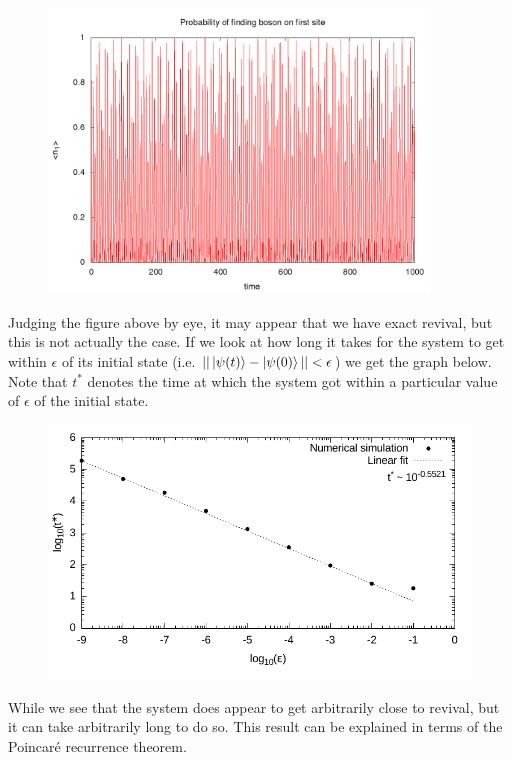 \documentclass[a4paper,10pt]{article}
\begin{document}
\begin{figure}[H]
 \includegraphics[width=0.9\textwidth]{5_by_1_T1e4_U0}
 \centering
\end{figure}
Judging the figure above by eye, it may appear that we have exact revival, but this is not actually the case. If we look at how long it takes for the system to get within $\epsilon$ of
its initial state (i.e. $||\ket{\psi(t)}-\ket{\psi(0)}||<\epsilon$)
we get the graph below. Note that $t^*$ denotes the time at which the system got within a particular value of $\epsilon$ of the initial state.
\begin{figure}[H]
 \includegraphics[width=1.0\textwidth]{recurrence_times}
 \centering
\end{figure}
While we see that the system does appear to get arbitrarily close to revival, but it can take arbitrarily long to do so. This result can be explained in terms of the Poincar\'e recurrence theorem.
\newpage
\end{document}

